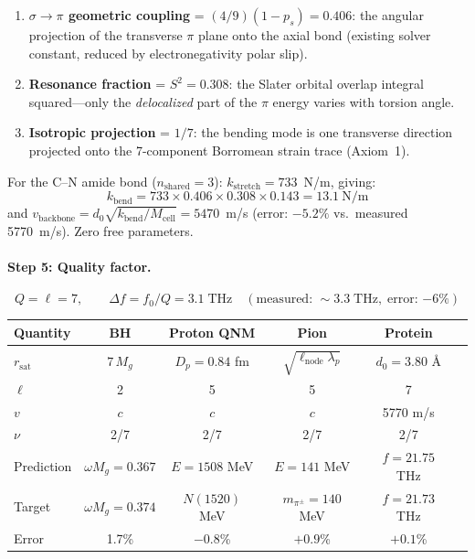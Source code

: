 \begin{enumerate}
    \item \textbf{$\sigma\to\pi$ geometric coupling} = $(4/9)(1-p_s) = 0.406$: the angular projection of the transverse $\pi$ plane onto the axial bond (existing solver constant, reduced by electronegativity polar slip).
    \item \textbf{Resonance fraction} = $S^2 = 0.308$: the Slater orbital overlap integral squared---only the \emph{delocalized} part of the $\pi$ energy varies with torsion angle.
    \item \textbf{Isotropic projection} = $1/7$: the bending mode is one transverse direction projected onto the 7-component Borromean strain trace (Axiom~1).
\end{enumerate}

\noindent For the C--N amide bond ($n_\mathrm{shared} = 3$): $k_\mathrm{stretch} = 733$~N/m, giving:
\begin{equation}
    k_\mathrm{bend} = 733 \times 0.406 \times 0.308 \times 0.143 = 13.1~\text{N/m}
\end{equation}
and $v_\mathrm{backbone} = d_0\sqrt{k_\mathrm{bend}/M_\mathrm{cell}} = 5470$~m/s (error: $-5.2\%$ vs.\ measured 5770~m/s).  Zero free parameters.

\paragraph{Step 5: Quality factor.}
\begin{equation}
    Q = \ell = 7, \qquad \Delta f = f_0 / Q = 3.1\;\mathrm{THz} \quad (\text{measured: } {\sim}3.3\;\mathrm{THz}, \;\text{error: }{-6\%})
\end{equation}

\begin{center}
\renewcommand{\arraystretch}{1.3}
\begin{tabular}{l c c c c c}
\toprule
\textbf{Quantity} & \textbf{BH} & \textbf{Proton QNM} & \textbf{Pion} & \textbf{Protein} \\
\midrule
$r_\mathrm{sat}$ & $7\,M_g$ & $D_p = 0.84$ fm & $\sqrt{\ell_\mathrm{node}\lambda_p}$ & $d_0 = 3.80$ \AA \\
$\ell$ & 2 & 5 & 5 & 7 \\
$v$ & $c$ & $c$ & $c$ & 5770 m/s \\
$\nu$ & 2/7 & 2/7 & 2/7 & 2/7 \\
Prediction & $\omega M_g = 0.367$ & $E = 1508$ MeV & $E = 141$ MeV & $f = 21.75$ THz \\
Target & $\omega M_g = 0.374$ & $N(1520)$ MeV & $m_{\pi^\pm} = 140$ MeV & $f = 21.73$ THz \\
Error & 1.7\% & $-0.8$\% & $+0.9$\% & $+0.1$\% \\
\bottomrule
\end{tabular}
\end{center}

